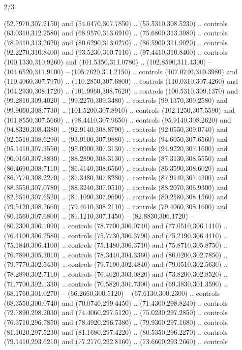 \begin{flagdescription}{2/3}
\begin{scope}[xshift=0.5\flaglength,yshift=0.5\flagwidth,scale=\stretchfactor]
\begin{scope}[scale=0.001645\flagwidth,yshift=65mm,xshift=-63mm]
\begin{scope}[y=0.80pt, x=0.80pt, yscale=-1,]
\begin{scope}[cm={{1.33333,0.0,0.0,1.33333,(0.0,1e-05)}}]
  (52.7970,307.2150) and (54.0470,307.7850) .. (55.5310,308.5230) .. controls
  (63.0310,312.2580) and (68.9570,313.6910) .. (75.6800,313.3980) .. controls
  (78.9410,313.2620) and (80.6290,313.0270) .. (86.5900,311.9020) .. controls
  (92.2270,310.8400) and (93.5230,310.7110) .. (97.4410,310.8400) .. controls
  (100.1330,310.9260) and (101.5350,311.0780) .. (102.8590,311.4300) --
  (104.6520,311.9100) -- (105.7620,311.2150) .. controls (107.0740,310.3980) and
  (110.4060,307.7970) .. (110.2850,307.6800) .. controls (110.0310,307.4260) and
  (104.2930,308.1720) .. (101.9960,308.7620) .. controls (100.5310,309.1370) and
  (99.2810,309.4020) .. (99.2270,309.3480) .. controls (99.1370,309.2580) and
  (99.9060,308.7730) .. (101.5200,307.8910) .. controls (102.1250,307.5590) and
  (101.8550,307.5660) .. (98.4410,307.9650) .. controls (95.9140,308.2620) and
  (94.8320,308.4380) .. (92.9140,308.8790) .. controls (92.0550,309.0740) and
  (92.5510,308.6290) .. (93.9100,307.9880) .. controls (94.6050,307.6560) and
  (95.1410,307.3550) .. (95.0900,307.3130) .. controls (94.9220,307.1600) and
  (90.0160,307.8830) .. (88.2890,308.3130) .. controls (87.3130,308.5550) and
  (86.4690,308.7110) .. (86.4140,308.6560) .. controls (86.3590,308.6020) and
  (86.7770,308.2270) .. (87.3480,307.8280) .. controls (87.9140,307.4300) and
  (88.3550,307.0780) .. (88.3240,307.0510) .. controls (88.2070,306.9300) and
  (82.5510,307.6520) .. (81.1090,307.9690) .. controls (80.2580,308.1560) and
  (79.5120,308.2660) .. (79.4610,308.2110) .. controls (79.4060,308.1600) and
  (80.1560,307.6800) .. (81.1210,307.1450) -- (82.8830,306.1720) --
  (80.2300,306.1090) .. controls (78.7700,306.0740) and (77.0510,306.1410) ..
  (76.4100,306.2580) .. controls (75.7730,306.3790) and (75.2190,306.4410) ..
  (75.1840,306.4100) .. controls (75.1480,306.3710) and (75.8710,305.8750) ..
  (76.7890,305.3010) .. controls (78.3440,304.3360) and (80.0200,302.7850) ..
  (79.7770,302.5430) .. controls (79.7190,302.4840) and (79.0510,302.5630) ..
  (78.2890,302.7110) .. controls (76.4020,303.0820) and (73.8200,302.8520) ..
  (71.7700,302.1330) .. controls (70.5820,301.7300) and (69.3830,301.3590) ..
  (68.1760,301.0270) -- (66.2660,300.5120) -- (67.6130,300.2300) .. controls
  (68.3550,300.0740) and (70.0740,299.4450) .. (71.4300,298.8240) .. controls
  (72.7890,298.2030) and (74.4060,297.5120) .. (75.0230,297.2850) .. controls
  (76.3710,296.7850) and (78.4920,296.7380) .. (79.9300,297.1680) .. controls
  (81.1020,297.5230) and (81.1680,297.4220) .. (80.5350,296.2270) .. controls
  (79.1410,293.6210) and (77.2770,292.8160) .. (73.6600,293.2660) .. controls

\end{scope}
\end{scope}
\end{scope}
\end{scope}
\end{flagdescription}
